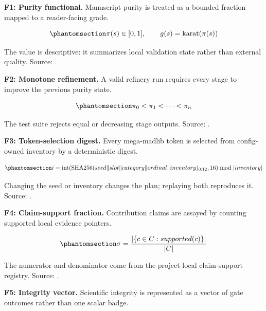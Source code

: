 \documentclass[
  english,
]{article}
\begin{document}
\textbf{F1: Purity functional.} Manuscript purity is treated as a
bounded fraction mapped to a reader-facing grade.

\begin{equation}\protect\phantomsection\label{eq:purity_functional}{
\pi(s) \in [0, 1], \qquad g(s) = \operatorname{karat}(\pi(s))
}\end{equation}

The value is descriptive: it summarizes local validation state rather
than external quality. Source: .

\textbf{F2: Monotone refinement.} A valid refinery run requires every
stage to improve the previous purity state.

\begin{equation}\protect\phantomsection\label{eq:monotone_refinery}{
\pi_0 < \pi_1 < \cdots < \pi_n
}\end{equation}

The test suite rejects equal or decreasing stage outputs. Source:
.

\textbf{F3: Token-selection digest.} Every mega-madlib token is selected
from config-owned inventory by a deterministic digest.

\begin{equation}\protect\phantomsection\label{eq:token_digest}{
i = \operatorname{int}(\operatorname{SHA256}(seed \Vert slot \Vert category \Vert ordinal \Vert inventory)_{0:12}, 16) \bmod \lvert inventory \rvert
}\end{equation}

Changing the seed or inventory changes the plan; replaying both
reproduces it. Source: .

\textbf{F4: Claim-support fraction.} Contribution claims are assayed by
counting supported local evidence pointers.

\begin{equation}\protect\phantomsection\label{eq:claim_support}{
\sigma = \frac{\lvert\{c \in C : supported(c)\}\rvert}{\lvert C \rvert}
}\end{equation}

The numerator and denominator come from the project-local claim-support
registry. Source:
.

\textbf{F5: Integrity vector.} Scientific integrity is represented as a
vector of gate outcomes rather than one scalar badge.
\end{document}
